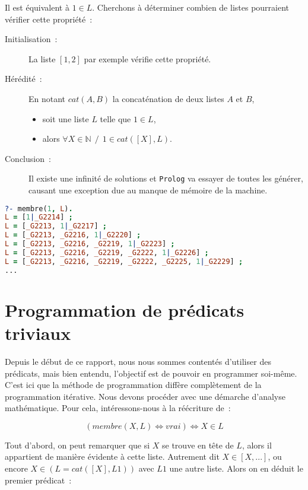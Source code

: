 Il est équivalent à $1 \in L$. Cherchons à déterminer combien de listes
pourraient vérifier cette propriété~:

\begin{description}
\item[Initialisation~:]{La liste $[1, 2]$ par exemple vérifie cette propriété.}
\item[Hérédité~:]
{
	En notant $cat(A, B)$ la concaténation de deux listes $A$ et $B$,
		\begin{itemize}
			\item soit une liste $L$ telle que $1 \in L$,
			\item alors $\forall X \in \mathbb{N}~~/~~1 \in cat([X], L)$.
		\end{itemize}
}

\item[Conclusion~:]{Il existe une infinité de solutions et \texttt{Prolog} va essayer
de toutes les générer, causant une exception due au manque de mémoire de la machine.}
\end{description}

\begin{lstlisting}[language=Prolog,frame=single]
?- membre(1, L).
L = [1|_G2214] ;
L = [_G2213, 1|_G2217] ;
L = [_G2213, _G2216, 1|_G2220] ;
L = [_G2213, _G2216, _G2219, 1|_G2223] ;
L = [_G2213, _G2216, _G2219, _G2222, 1|_G2226] ;
L = [_G2213, _G2216, _G2219, _G2222, _G2225, 1|_G2229] ;
...
\end{lstlisting}


\section{Programmation de prédicats triviaux}

Depuis le début de ce rapport, nous nous sommes contentés d'utiliser des prédicats, mais bien entendu,
l'objectif est de pouvoir en programmer soi-même. C'est ici que la méthode de programmation diffère
complètement de la programmation itérative. Nous devons procéder avec une démarche
d'analyse mathématique. Pour cela, intéressons-nous à la réécriture de~:

\[
	(membre(X, L) \Leftrightarrow vrai) \Leftrightarrow X \in L
\]

Tout d'abord, on peut remarquer que si $X$ se trouve en tête de $L$, alors il appartient de manière évidente à cette liste. Autrement dit $X \in [X, ...]$, ou encore
$X \in (L = cat([X], L1))$ avec $L1$ une autre liste. Alors on en déduit le premier prédicat~:

